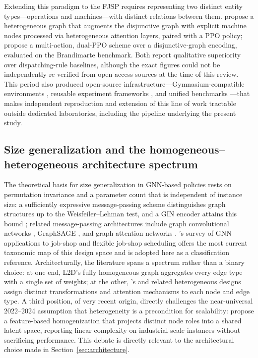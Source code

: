 \documentclass[11pt]{article}
\begin{document}
Extending this paradigm to the FJSP requires representing two distinct entity types---operations and machines---with distinct relations between them. \citet{song2023} propose a heterogeneous graph that augments the disjunctive graph with explicit machine nodes processed via heterogeneous attention layers, paired with a PPO policy; \citet{lei2022} propose a multi-action, dual-PPO scheme over a disjunctive-graph encoding, evaluated on the Brandimarte \citep{brandimarte1993} benchmark. Both report qualitative superiority over dispatching-rule baselines, although the exact figures could not be independently re-verified from open-access sources at the time of this review. This period also produced open-source infrastructure---Gymnasium-compatible environments \citep{tassel2021}, reusable experiment frameworks \citep{waubert2023schlably}, and unified benchmarks \citep{reijnen2023benchmark}---that makes independent reproduction and extension of this line of work tractable outside dedicated laboratories, including the pipeline underlying the present study.

\subsection{Size generalization and the homogeneous--heterogeneous architecture spectrum}

The theoretical basis for size generalization in GNN-based policies rests on permutation invariance and a parameter count that is independent of instance size: a sufficiently expressive message-passing scheme distinguishes graph structures up to the Weisfeiler--Lehman test, and a GIN encoder attains this bound \citep{xu2019gin}; related message-passing architectures include graph convolutional networks \citep{kipf2017gcn}, GraphSAGE \citep{hamilton2017graphsage}, and graph attention networks \citep{velickovic2018gat}. \citet{smit2024survey}'s survey of GNN applications to job-shop and flexible job-shop scheduling offers the most current taxonomic map of this design space and is adopted here as a classification reference. Architecturally, the literature spans a spectrum rather than a binary choice: at one end, L2D's fully homogeneous graph aggregates every edge type with a single set of weights; at the other, \citet{song2023}'s and related heterogeneous designs assign distinct transformations and attention mechanisms to each node and edge type. A third position, of very recent origin, directly challenges the near-universal 2022--2024 assumption that heterogeneity is a precondition for scalability: \citet{hoss2026} propose a feature-based homogenization that projects distinct node roles into a shared latent space, reporting linear complexity on industrial-scale instances without sacrificing performance. This debate is directly relevant to the architectural choice made in Section~\ref{sec:architecture}.
\end{document}
